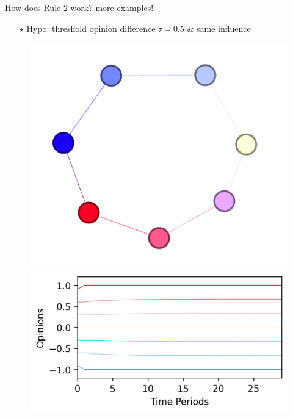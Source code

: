 \documentclass[xcolor=table,handout]{beamer}
\begin{document}
\begin{frame}{How does Rule 2 work? more examples! }
\begin{itemize} \item[$\star$] Hypo: threshold opinion difference $\tau = 0.5$ \& same influence \end{itemize}
\begin{figure}
\centering
\begin{minipage}{.5\textwidth}
  \centering
  \includegraphics[scale = 0.55]{./img/moderate.png}
\end{minipage}%
\begin{minipage}{.5\textwidth}
  \centering
  \includegraphics[scale = 0.55]{./img/plot_moderate.jpg}
\end{minipage}
\end{figure}

\end{frame}
\end{document}
